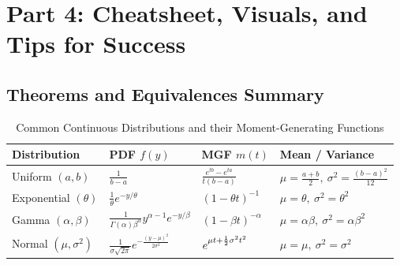 \documentclass[11pt, a4paper]{article}
\theoremstyle{definition}
\theoremstyle{remark}
\begin{document}
\newpage

\section{Part 4: Cheatsheet, Visuals, and Tips for Success}

\subsection{Theorems and Equivalences Summary}
\begin{table}[htbp]
\centering
\renewcommand{\arraystretch}{1.5} 
\begin{tabularx}{\textwidth}{l X X X}
\toprule
\textbf{Distribution} & \textbf{PDF} $f(y)$ & \textbf{MGF} $m(t)$ & \textbf{Mean / Variance} \\
\midrule
Uniform $(a,b)$ & $\displaystyle \frac{1}{b-a}$ & $\displaystyle \frac{e^{tb}-e^{ta}}{t(b-a)}$ & $\displaystyle \mu = \frac{a+b}{2},\ \sigma^2 = \frac{(b-a)^2}{12}$ \\ 
\addlinespace[4pt] %

Exponential $(\theta)$ & $\displaystyle \frac{1}{\theta}e^{-y/\theta}$ & $\displaystyle (1-\theta t)^{-1}$ & $\displaystyle \mu = \theta,\ \sigma^2 = \theta^2$ \\ 
\addlinespace[4pt]

Gamma $(\alpha, \beta)$ & $\displaystyle \frac{1}{\Gamma(\alpha)\beta^\alpha} y^{\alpha-1} e^{-y/\beta}$ & $\displaystyle (1-\beta t)^{-\alpha}$ & $\displaystyle \mu = \alpha\beta,\ \sigma^2 = \alpha\beta^2$ \\ 
\addlinespace[4pt]

Normal $(\mu, \sigma^2)$ & $\displaystyle \frac{1}{\sigma\sqrt{2\pi}} e^{-\frac{(y-\mu)^2}{2\sigma^2}}$ & $\displaystyle e_{\vphantom{A}}^{\mu t + \frac{1}{2}\sigma^2 t^2}$ & $\displaystyle \mu = \mu,\ \sigma^2 = \sigma^2$ \\
\bottomrule
\end{tabularx}
\caption{Common Continuous Distributions and their Moment-Generating Functions}
\end{table}
\end{document}
